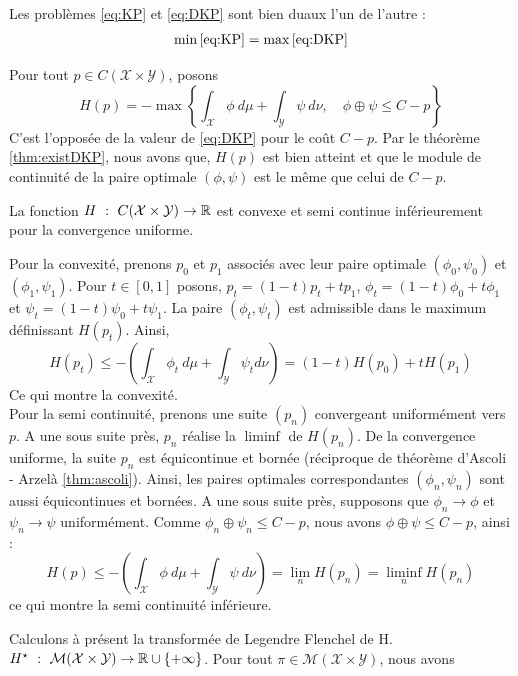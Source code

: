 \documentclass[a4paper,12pt]{article}
\begin{document}
\begin{theoreme}{}
\label{thm:dualite}
Les problèmes \eqref{eq:KP} et \eqref{eq:DKP} sont bien duaux l'un de l'autre :
\begin{align}
\min\eqref{eq:KP} = \max\eqref{eq:DKP}
\end{align}
\end{theoreme}
\begin{preuve}
Pour tout $p\in C(\mathcal{X}\times\mathcal{Y})$, posons 
$$
H(p) = -\max\left\{\int_{\mathcal{X}} \phi\ d\mu +\int_{\mathcal{Y}} \psi\ d\nu, \quad \phi\oplus\psi\leq C-p\right\}
$$
C'est l'opposée de la valeur de \eqref{eq:DKP} pour le coût $C-p$. Par le théorème \ref{thm:existDKP}, nous avons que, $H(p)$ est bien atteint et que le module de continuité de la paire optimale $(\phi,\psi)$ est le même que celui de $C-p$. 
\begin{lemme}
La fonction $H\ :\ C(\mathcal{X}\times\mathcal{Y})\rightarrow\RR$ est convexe et semi continue inférieurement pour la convergence uniforme.
\end{lemme}
\begin{preuve}
Pour la convexité, prenons $p_0$ et $p_1$ associés avec leur paire optimale $(\phi_0,\psi_0)$ et $(\phi_1,\psi_1)$. Pour $t\in [0,1]$ posons, $p_t=(1-t)p_t+tp_1$, $\phi_t=(1-t)\phi_0 + t\phi_1$ et $\psi_t=(1-t)\psi_0+t\psi_1$. La paire $(\phi_t,\psi_t)$ est admissible dans le maximum définissant $H(p_t)$. Ainsi, 
$$
H(p_t)\leq-\left(\int_{\mathcal{X}}\phi_t\ d\mu+\int_{\mathcal{Y}}\psi_t d\nu\right) = (1-t)H(p_0)+tH(p_1)
$$
Ce qui montre la convexité.\\
Pour la semi continuité, prenons une suite $(p_n)$ convergeant uniformément vers $p$. A une sous suite près, $p_n$ réalise la $\liminf$ de $H(p_n)$. De la convergence uniforme, la suite $p_n$ est équicontinue et bornée (réciproque de théorème d'Ascoli - Arzelà \eqref{thm:ascoli}). Ainsi, les paires optimales correspondantes $(\phi_n,\psi_n)$ sont aussi équicontinues et bornées. A une sous suite près, supposons que $\phi_n\rightarrow\phi$ et $\psi_n\rightarrow\psi$ uniformément. Comme $\phi_n\oplus\psi_n\leq C-p$, nous avons $\phi\oplus\psi\leq C-p$, ainsi :
$$
H(p) \leq - \left(\int_{\mathcal{X}}\phi\ d\mu+\int_{\mathcal{Y}}\psi\ d\nu\right) = \lim_n H(p_n)=\liminf_n H(p_n)
$$
ce qui montre la semi continuité inférieure.
\end{preuve}
Calculons à présent la transformée de Legendre Flenchel de H.\\
$H^{\star}\ :\ \mathcal{M}(\mathcal{X}\times\mathcal{Y})\rightarrow\RR\cup\{+\infty\}$. Pour tout $\pi\in\mathcal{M}(\mathcal{X}\times\mathcal{Y})$, nous avons 

\end{preuve}
\end{document}
